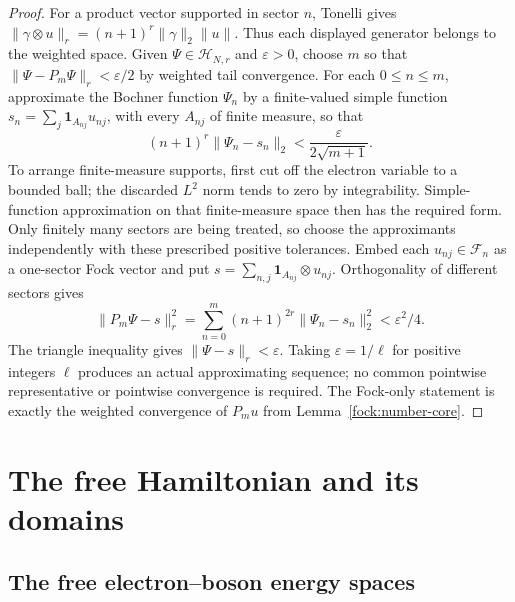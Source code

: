 \documentclass[11pt,a4paper]{article}
\theoremstyle{definition}
\theoremstyle{remark}
\begin{document}
\begin{proof}
For a product vector supported in sector $n$, Tonelli gives
$\|\gamma\otimes u\|_r=(n+1)^r\|\gamma\|_2\|u\|$.
Thus each displayed generator belongs to the weighted space.
Given $\Psi\in\mathcal H_{N,r}$ and $\varepsilon>0$, choose $m$
so that $\|\Psi-P_m\Psi\|_r<\varepsilon/2$ by weighted tail
convergence. For each $0\leq n\leq m$, approximate the Bochner
function $\Psi_n$ by a finite-valued simple function
$s_n=\sum_j\mathbf1_{A_{nj}}u_{nj}$, with every $A_{nj}$ of
finite measure, so that
\[
 (n+1)^r\|\Psi_n-s_n\|_2
                  <\frac{\varepsilon}{2\sqrt{m+1}}.
\]
To arrange finite-measure supports, first cut off the electron
variable to a bounded ball; the discarded $L^2$ norm tends to
zero by integrability. Simple-function approximation on that
finite-measure space then has the required form. Only finitely
many sectors are being treated, so choose the approximants
independently with these prescribed positive tolerances.
Embed each $u_{nj}\in\mathcal F_n$ as a one-sector Fock vector
and put $s=\sum_{n,j}\mathbf1_{A_{nj}}\otimes u_{nj}$. Orthogonality
of different sectors gives
\[
 \|P_m\Psi-s\|_r^2
   =\sum_{n=0}^m(n+1)^{2r}\|\Psi_n-s_n\|_2^2
   <\varepsilon^2/4.
\]
The triangle inequality gives $\|\Psi-s\|_r<\varepsilon$.
Taking $\varepsilon=1/\ell$ for positive integers $\ell$ produces
an actual approximating sequence; no common pointwise
representative or pointwise convergence is required.
The Fock-only statement is exactly the weighted convergence of
$P_m u$ from Lemma~\ref{fock:number-core}.
\end{proof}


\section{The free Hamiltonian and its domains}
\label{sec:free-model}
\subsection{The free electron--boson energy spaces}
\label{sec:free-energy-model}
\end{document}
